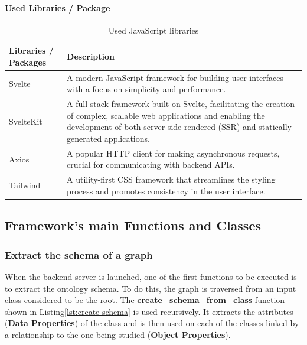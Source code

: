         \paragraph{Used Libraries / Package}
        \begin{table}[h]
            \centering
    	    {
    	    \begin{tabular}{ | m{2.5cm} | m{12cm} | }
                \hline
                \rowcolor{teal!30} Libraries / Packages & Description \\
                
                \hline
                Svelte & A modern JavaScript framework for building user interfaces with a focus on simplicity and performance. \\

                \hline
                SvelteKit & A full-stack framework built on Svelte, facilitating the creation of complex, scalable web applications and enabling the development of both server-side rendered (SSR) and statically generated applications. \\

                \hline
                Axios & A popular HTTP client for making asynchronous requests, crucial for communicating with backend APIs. \\

                \hline
                Tailwind & A utility-first CSS framework that streamlines the styling process and promotes consistency in the user interface.\\

                \hline
            \end{tabular}}
            \caption{\label{tab:js-libs} Used JavaScript libraries}
        \end{table}
        
\subsection{Framework's main Functions and Classes}
\subsubsection{Extract the schema of a graph}
 When the backend server is launched, one of the first functions to be executed is to extract the ontology schema. To do this, the graph is traversed from an input class considered to be the root. The \textbf{create\_schema\_from\_class} function shown in Listing\ref{lst:create-schema} is used recursively. It extracts the attributes (\textbf{Data Properties}) of the class and is then used on each of the classes linked by a relationship to the one being studied (\textbf{Object Properties}).\\

